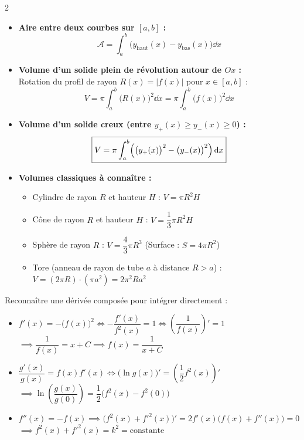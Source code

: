 {\begin{multicols}{2}
\columnbreak

\begin{itemize}[leftmargin=1.2em, itemsep=2pt, topsep=2pt]
    \item \textbf{Aire entre deux courbes sur $[a, b]$ :}
    \[
        \mathcal{A} = \int_a^b \bigl(y_{\text{haut}}(x) - y_{\text{bas}}(x)\bigr)\dd x
    \]
    \item \textbf{Volume d'un solide plein de révolution autour de $Ox$ :}\\
    Rotation du profil de rayon $R(x) = |f(x)|$ pour $x \in [a, b]$ :
    \[
        \boxed{V = \pi \int_a^b \bigl(R(x)\bigr)^2\dd x = \pi \int_a^b \bigl(f(x)\bigr)^2\dd x}
    \]
    \item \textbf{Volume d'un solide creux (entre $y_+(x) \ge y_-(x) \ge 0$) :}
    \[
        \boxed{V = \pi \int_a^b \Bigl(\bigl(y_+(x)\bigr)^2 - \bigl(y_-(x)\bigr)^2\Bigr)\,\mathrm{d} x}
    \]
    \item \textbf{Volumes classiques à connaître :}
    \begin{itemize}[leftmargin=1em, itemsep=1.5pt, topsep=1pt]
        \item Cylindre de rayon $R$ et hauteur $H$ : $V = \pi R^2 H$
        \item Cône de rayon $R$ et hauteur $H$ : $V = \dfrac{1}{3}\pi R^2 H$
        \item Sphère de rayon $R$ : $V = \dfrac{4}{3}\pi R^3$ \quad (Surface : $S = 4\pi R^2$)
        \item Tore (anneau de rayon de tube $a$ à distance $R > a$) :\\
        $V = (2\pi R)\cdot(\pi a^2) = 2\pi^2 R a^2$
    \end{itemize}
\end{itemize}

\vspace{4pt}
Reconnaître une dérivée composée pour intégrer directement :
\begin{itemize}[leftmargin=1.2em, itemsep=2pt, topsep=2pt]
    \item $f'(x) = -\bigl(f(x)\bigr)^2 \iff -\dfrac{f'(x)}{f^2(x)} = 1 \iff \left(\dfrac{1}{f(x)}\right)' = 1$\\
    $\implies \dfrac{1}{f(x)} = x + C \implies f(x) = \dfrac{1}{x + C}$
    \item $\dfrac{g'(x)}{g(x)} = f(x)f'(x) \iff \bigl(\ln g(x)\bigr)' = \left(\dfrac{1}{2}f^2(x)\right)'$\\
    $\implies \ln\left(\dfrac{g(x)}{g(0)}\right) = \dfrac{1}{2}\bigl(f^2(x) - f^2(0)\bigr)$
    \item $f''(x) = -f(x) \implies \bigl(f^2(x) + f'^2(x)\bigr)' = 2f'(x)\bigl(f(x) + f''(x)\bigr) = 0$\\
    $\implies f^2(x) + f'^2(x) = k^2 = \text{constante}$
\end{itemize}

\end{multicols}
}

\restoregeometry
